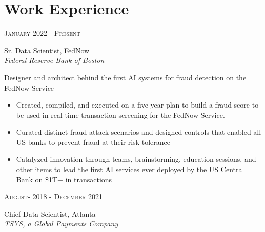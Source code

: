 \documentclass[10pt]{article} %
\begin{document}
\begin{minipage}[t]{0.5\textwidth} %
\vspace{0pt} %
	

\section{Work Experience} 

{\raggedleft\textsc{January 2022 - Present}\par}

{\raggedright\large Sr. Data Scientist,  FedNow\\ 
\textit{Federal Reserve Bank of Boston}\\[5pt]}

\normalsize{Designer and architect behind the first AI systems for fraud detection on the FedNow Service     \\

\begin{itemize}
\item Created, compiled, and executed on a five year plan to build a fraud score to be used in real-time transaction screening for the FedNow Service. 
\item Curated distinct fraud attack scenarios and designed controls that enabled all US banks to prevent fraud at their risk tolerance
\item Catalyzed innovation through teams, brainstorming, education sessions, and other items to lead the first AI services ever deployed by the US Central Bank on \$1T+ in transactions
\end{itemize}}

{\raggedleft\textsc{August- 2018 - December 2021}\par}

{\raggedright\large Chief Data Scientist, Atlanta\\ 
\textit{TSYS, a Global Payments Company}\\[5pt]}


\end{minipage}
\end{document}
